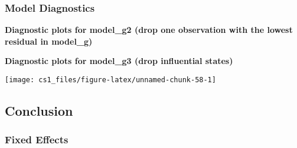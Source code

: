 \documentclass[
  11pt,
]{article}
\begin{document}
\hypertarget{model-diagnostics-1}{%
\subsubsection{Model Diagnostics}\label{model-diagnostics-1}}

\textbf{Diagnostic plots for model\_g2 (drop one observation with the
lowest residual in model\_g)}

\textbf{Diagnostic plots for model\_g3 (drop influential states)}

\begin{center}\texttt{[image: cs1\_files/figure-latex/unnamed-chunk-58-1]} \end{center}

\hypertarget{conclusion-1}{%
\subsection{Conclusion}\label{conclusion-1}}

\hypertarget{fixed-effects-1}{%
\subsubsection{Fixed Effects}\label{fixed-effects-1}}
\end{document}
